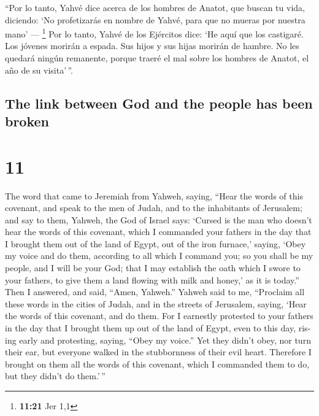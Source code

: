 \begin{paracol}{2}
 ``Por lo tanto, Yahvé dice acerca de los hombres de
Anatot, que buscan tu vida, diciendo: `No profetizarás en nombre de
Yahvé, para que no mueras por nuestra mano' --- \footnote{\textbf{11:21}
  Jer 1,1}  Por lo tanto, Yahvé de los Ejércitos dice:
`He aquí que los castigaré. Los jóvenes morirán a espada. Sus hijos y
sus hijas morirán de hambre.  No les quedará ningún
remanente, porque traeré el mal sobre los hombres de Anatot, el año de
su visita'\,''.

\switchcolumn
\begin{otherlanguage}{english}

\hypertarget{the-link-between-god-and-the-people-has-been-broken}{%
\subsection{The link between God and the people has been
broken}\label{the-link-between-god-and-the-people-has-been-broken}}

\hypertarget{section-21}{%
\section{11}\label{section-21}}

 The word that came to Jeremiah from Yahweh, saying,
 ``Hear the words of this covenant, and speak to the men
of Judah, and to the inhabitants of Jerusalem;  and say to
them, Yahweh, the God of Israel says: `Cursed is the man who doesn't
hear the words of this covenant,  which I commanded your
fathers in the day that I brought them out of the land of Egypt, out of
the iron furnace,' saying, `Obey my voice and do them, according to all
which I command you; so you shall be my people, and I will be your God;
 that I may establish the oath which I swore to your
fathers, to give them a land flowing with milk and honey,' as it is
today.'' Then I answered, and said, ``Amen, Yahweh.'' 
Yahweh said to me, ``Proclaim all these words in the cities of Judah,
and in the streets of Jerusalem, saying, `Hear the words of this
covenant, and do them.  For I earnestly protested to your
fathers in the day that I brought them up out of the land of Egypt, even
to this day, rising early and protesting, saying, ``Obey my voice.''
 Yet they didn't obey, nor turn their ear, but everyone
walked in the stubbornness of their evil heart. Therefore I brought on
them all the words of this covenant, which I commanded them to do, but
they didn't do them.'\,''


\end{otherlanguage}
\end{paracol}
